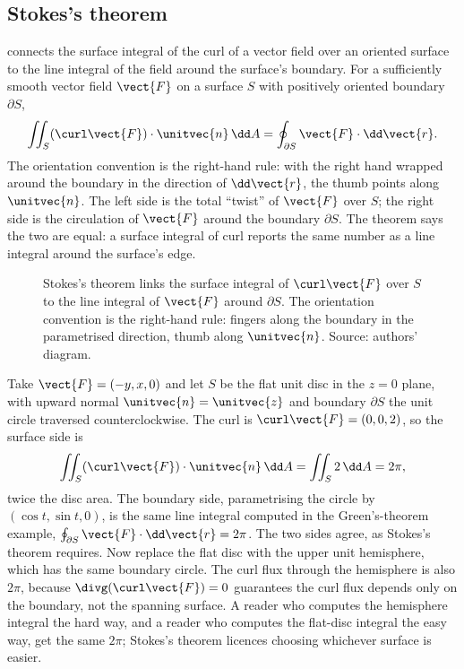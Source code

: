 \subsection{Stokes's theorem}

 connects the surface integral of the curl
of a vector field over an oriented surface to the line integral of
the field around the surface's boundary. For a sufficiently smooth
vector field $\vect{F}$ on a surface $S$ with positively oriented
boundary $\partial S$,
\[
\iint_{S} (\curl\vect{F}) \cdot \unitvec{n} \,\dd A =
\oint_{\partial S} \vect{F} \cdot \dd\vect{r}.
\]
The orientation convention is the right-hand rule: with the right
hand wrapped around the boundary in the direction of $\dd\vect{r}$,
the thumb points along $\unitvec{n}$. The left side is the total
``twist'' of $\vect{F}$ over $S$; the right side is the
circulation of $\vect{F}$ around the boundary $\partial S$. The
theorem says the two are equal: a surface integral of curl reports
the same number as a line integral around the surface's edge.

\begin{figure}[h]
  \centering
  
  \caption[Stokes orientation: right-hand rule between boundary and
  normal.]{Stokes's theorem links the surface integral of $\curl
  \vect{F}$ over $S$ to the line integral of $\vect{F}$ around
  $\partial S$. The orientation convention is the right-hand rule:
  fingers along the boundary in the parametrised direction, thumb
  along $\unitvec{n}$. Source: authors' diagram.}
  \label{fig:vol02:ch08:stokes-orientation}
\end{figure}

\begin{example}
Take $\vect{F} = (-y, x, 0)$ and let $S$ be the flat unit disc in the
$z = 0$ plane, with upward normal $\unitvec{n} = \unitvec{z}$ and
boundary $\partial S$ the unit circle traversed counterclockwise. The
curl is $\curl\vect{F} = (0, 0, 2)$, so the surface side is
\[
\iint_{S}(\curl\vect{F})\cdot\unitvec{n}\,\dd A = \iint_{S}2\,\dd A =
2\pi,
\]
twice the disc area. The boundary side, parametrising the circle by
$(\cos t, \sin t, 0)$, is the same line integral computed in the
Green's-theorem example, $\oint_{\partial S}\vect{F}\cdot\dd\vect{r} =
2\pi$. The two sides agree, as Stokes's theorem requires. Now replace
the flat disc with the upper unit hemisphere, which has the same
boundary circle. The curl flux through the hemisphere is also $2\pi$,
because $\divg(\curl\vect{F}) = 0$ guarantees the curl flux depends
only on the boundary, not the spanning surface. A reader who computes
the hemisphere integral the hard way, and a reader who computes the
flat-disc integral the easy way, get the same $2\pi$; Stokes's theorem
licences choosing whichever surface is easier.
\end{example}

